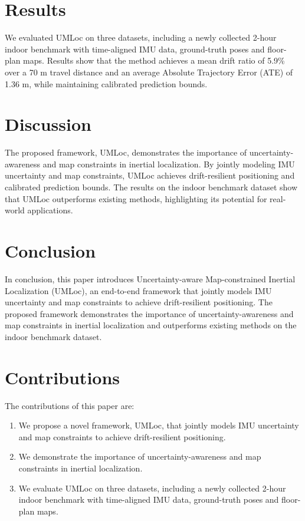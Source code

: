\documentclass{article}
\begin{document}
\section{Results}
\label{sec:results}
We evaluated UMLoc on three datasets, including a newly collected 2-hour indoor benchmark with time-aligned IMU data, ground-truth poses and floor-plan maps. Results show that the method achieves a mean drift ratio of 5.9\% over a 70 m travel distance and an average Absolute Trajectory Error (ATE) of 1.36 m, while maintaining calibrated prediction bounds.

\section{Discussion}
\label{sec:discussion}
The proposed framework, UMLoc, demonstrates the importance of uncertainty-awareness and map constraints in inertial localization. By jointly modeling IMU uncertainty and map constraints, UMLoc achieves drift-resilient positioning and calibrated prediction bounds. The results on the indoor benchmark dataset show that UMLoc outperforms existing methods, highlighting its potential for real-world applications.

\section{Conclusion}
\label{sec:conclusion}
In conclusion, this paper introduces Uncertainty-aware Map-constrained Inertial Localization (UMLoc), an end-to-end framework that jointly models IMU uncertainty and map constraints to achieve drift-resilient positioning. The proposed framework demonstrates the importance of uncertainty-awareness and map constraints in inertial localization and outperforms existing methods on the indoor benchmark dataset.

\section{Contributions}
\label{sec:contributions}
The contributions of this paper are:

\begin{enumerate}
\item We propose a novel framework, UMLoc, that jointly models IMU uncertainty and map constraints to achieve drift-resilient positioning.
\item We demonstrate the importance of uncertainty-awareness and map constraints in inertial localization.
\item We evaluate UMLoc on three datasets, including a newly collected 2-hour indoor benchmark with time-aligned IMU data, ground-truth poses and floor-plan maps.
\end{enumerate}
\end{document}
